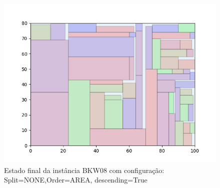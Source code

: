 \begin{figure}[H]
    \centering
    \caption[]{Estado final da instância BKW08 com configuração: Split=NONE,Order=AREA, descending=True}
    \label{fig:bkw08-none-area-true}
    \includegraphics[scale=0.5]{output/figures/bkw/bkw08/none/area/true/00}
\end{figure}